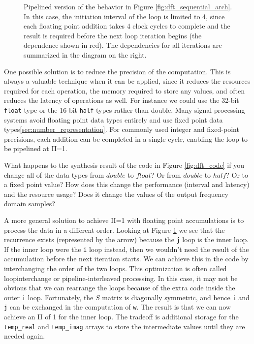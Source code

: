 \begin{figure}
\centering

\caption{Pipelined version of the behavior in Figure \ref{fig:dft_sequential_arch}.  In this case, the initiation interval of the loop is limited to 4, since each floating point addition takes 4 clock cycles to complete and the result is required before the next loop iteration begins (the dependence shown in red).  The dependencies  for all iterations are summarized in the diagram on the right.}
\label{fig:dft_recurrence_behavior}
\end{figure}

One possible solution is to reduce the precision of the computation.  This is always a valuable technique when it can be applied, since it reduces the resources required for each operation, the memory required to store any values, and often reduces the latency of operations as well.  For instance we could use the 32-bit \lstinline|float| type or the 16-bit \lstinline|half| types rather than double.  Many signal processing systems avoid floating point data types entirely and use fixed point data types\ref{sec:number_representation}.  For commonly used integer and fixed-point precisions, each addition can be completed in a single cycle, enabling the loop to be pipelined at II=1.

\begin{exercise}
What happens to the synthesis result of the code in Figure \ref{fig:dft_code} if you change all of the data types from $double$ to $float$? Or from $double$ to $half$? Or to a fixed point value? How does this change the performance (interval and latency) and the resource usage? Does it change the values of the output frequency domain samples?
\end{exercise}

A more general solution to achieve II=1 with floating point accumulations is to process the data in a different order.  Looking at Figure \ref{fig:dft_recurrence_behavior} we see that the recurrence exists (represented by the arrow) because the \lstinline|j| loop is the inner loop.  If the inner loop were the \lstinline|i| loop instead, then we wouldn't need the result of the accumulation before the next iteration starts.  We can achieve this in the code by interchanging the order of the two loops.  This optimization is often called \gls{loopinterchange} or pipeline-interleaved processing\cite{lee87sdfArchitecture}.  In this case, it may not be obvious that we can rearrange the loops because of the extra code inside the outer \lstinline|i| loop.  Fortunately, the $S$ matrix is diagonally symmetric, and hence \lstinline|i| and \lstinline|j| can be exchanged in the computation of \lstinline|w|.  The result is that we can now achieve an II of 1 for the inner loop.  The tradeoff is additional storage for the \lstinline|temp_real| and \lstinline|temp_imag| arrays to store the intermediate values until they are needed again.

